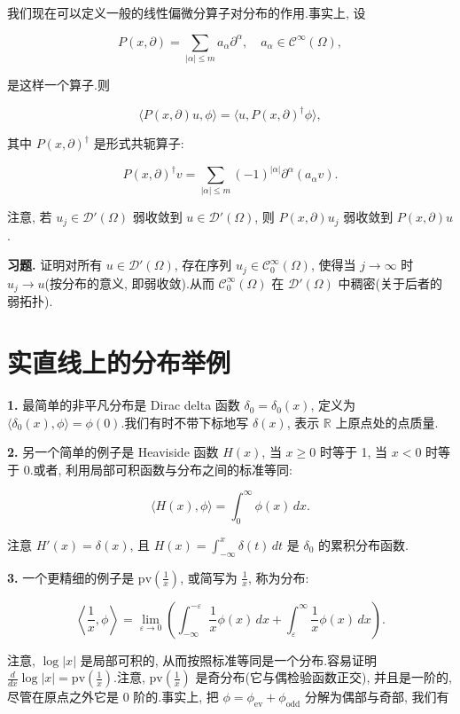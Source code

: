 我们现在可以定义一般的线性偏微分算子对分布的作用.事实上, 设

\[
P(x, \partial) = \sum_{|\alpha|\leq m}a_{\alpha}\partial^{\alpha}, \quad a_{\alpha}\in\mathcal{C}^{\infty}(\Omega),
\]

是这样一个算子.则

\[
\langle P(x, \partial)u, \phi\rangle = \langle u, P(x, \partial)^{\dagger}\phi\rangle,
\]

其中 $P(x, \partial)^{\dagger}$ 是形式共轭算子:

\[
P(x, \partial)^{\dagger}v = \sum_{|\alpha|\leq m}(-1)^{|\alpha|}\partial^{\alpha}(a_{\alpha}v).
\]

注意, 若 $u_j\in\mathcal{D}'(\Omega)$ 弱收敛到 $u\in\mathcal{D}'(\Omega)$, 则 $P(x, \partial)u_j$ 弱收敛到 $P(x, \partial)u$.

\textbf{习题.} 证明对所有 $u\in\mathcal{D}'(\Omega)$, 存在序列 $u_j\in\mathcal{C}_0^{\infty}(\Omega)$, 使得当 $j\to\infty$ 时 $u_j\to u$(按分布的意义, 即弱收敛).从而 $\mathcal{C}_0^{\infty}(\Omega)$ 在 $\mathcal{D}'(\Omega)$ 中稠密(关于后者的弱拓扑).

\section{实直线上的分布举例}

\textbf{1.} 最简单的非平凡分布是 Dirac delta 函数 $\delta_0 = \delta_0(x)$, 定义为 $\langle\delta_0(x), \phi\rangle = \phi(0)$.我们有时不带下标地写 $\delta(x)$, 表示 $\mathbb{R}$ 上原点处的点质量.

\textbf{2.} 另一个简单的例子是 Heaviside 函数 $H(x)$, 当 $x\geq 0$ 时等于 1, 当 $x<0$ 时等于 0.或者, 利用局部可积函数与分布之间的标准等同:

\[
\langle H(x), \phi\rangle = \int_0^{\infty}\phi(x)\, dx.
\]

注意 $H'(x) = \delta(x)$, 且 $H(x) = \int_{-\infty}^x\delta(t)\, dt$ 是 $\delta_0$ 的累积分布函数.

\textbf{3.} 一个更精细的例子是 $\mathrm{pv}(\frac{1}{x})$, 或简写为 $\frac{1}{x}$, 称为分布:

\[
\left\langle\frac{1}{x}, \phi\right\rangle = \lim_{\varepsilon\to 0}\left(\int_{-\infty}^{-\varepsilon}\frac{1}{x}\phi(x)\, dx + \int_{\varepsilon}^{\infty}\frac{1}{x}\phi(x)\, dx\right).
\]

注意, $\log|x|$ 是局部可积的, 从而按照标准等同是一个分布.容易证明 $\frac{d}{dx}\log|x| = \mathrm{pv}(\frac{1}{x})$.注意, $\mathrm{pv}(\frac{1}{x})$ 是奇分布(它与偶检验函数正交), 并且是一阶的, 尽管在原点之外它是 0 阶的.事实上, 把 $\phi = \phi_{\mathrm{ev}} + \phi_{\mathrm{odd}}$ 分解为偶部与奇部, 我们有

